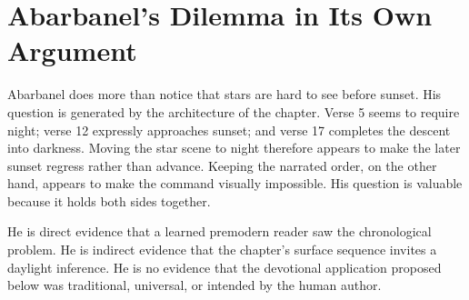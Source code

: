 \section{Abarbanel's Dilemma in Its Own Argument}

Abarbanel does more than notice that stars are hard to see before sunset. His
question is generated by the architecture of the chapter. Verse 5 seems to
require night; verse 12 expressly approaches sunset; and verse 17 completes
the descent into darkness. Moving the star scene to night therefore appears to
make the later sunset regress rather than advance. Keeping the narrated order,
on the other hand, appears to make the command visually impossible. His
question is valuable because it holds both sides together.

He is direct evidence that a learned premodern reader saw the chronological
problem. He is indirect evidence that the chapter's surface sequence invites a
daylight inference. He is no evidence that the devotional application proposed
below was traditional, universal, or intended by the human author.

